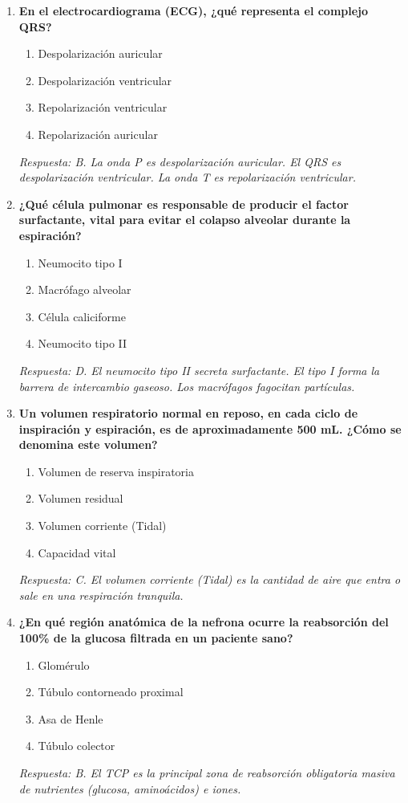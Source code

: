 \documentclass[spanish,letterpaper,oneside]{article}
\begin{document}
\begin{enumerate}[label=\textbf{\arabic*.}]
    \item \textbf{En el electrocardiograma (ECG), ¿qué representa el complejo QRS?}
    \begin{enumerate}
        \item[A)] Despolarización auricular
        \item[B)] Despolarización ventricular
        \item[C)] Repolarización ventricular
        \item[D)] Repolarización auricular
    \end{enumerate}
    \textit{Respuesta: B. La onda P es despolarización auricular. El QRS es despolarización ventricular. La onda T es repolarización ventricular.}

    \item \textbf{¿Qué célula pulmonar es responsable de producir el factor surfactante, vital para evitar el colapso alveolar durante la espiración?}
    \begin{enumerate}
        \item[A)] Neumocito tipo I
        \item[B)] Macrófago alveolar
        \item[C)] Célula caliciforme
        \item[D)] Neumocito tipo II
    \end{enumerate}
    \textit{Respuesta: D. El neumocito tipo II secreta surfactante. El tipo I forma la barrera de intercambio gaseoso. Los macrófagos fagocitan partículas.}

    \item \textbf{Un volumen respiratorio normal en reposo, en cada ciclo de inspiración y espiración, es de aproximadamente 500 mL. ¿Cómo se denomina este volumen?}
    \begin{enumerate}
        \item[A)] Volumen de reserva inspiratoria
        \item[B)] Volumen residual
        \item[C)] Volumen corriente (Tidal)
        \item[D)] Capacidad vital
    \end{enumerate}
    \textit{Respuesta: C. El volumen corriente (Tidal) es la cantidad de aire que entra o sale en una respiración tranquila.}

    \item \textbf{¿En qué región anatómica de la nefrona ocurre la reabsorción del 100\% de la glucosa filtrada en un paciente sano?}
    \begin{enumerate}
        \item[A)] Glomérulo
        \item[B)] Túbulo contorneado proximal
        \item[C)] Asa de Henle
        \item[D)] Túbulo colector
    \end{enumerate}
    \textit{Respuesta: B. El TCP es la principal zona de reabsorción obligatoria masiva de nutrientes (glucosa, aminoácidos) e iones.}


\end{enumerate}
\end{document}
